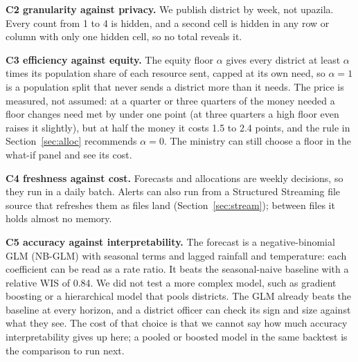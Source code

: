 \textbf{C2 granularity against privacy.} We publish district by week, not upazila. Every count from 1 to 4 is
hidden, and a second cell is hidden in any row or column with only one hidden cell, so no total reveals it.

\textbf{C3 efficiency against equity.} The equity floor $\alpha$ gives every district at least $\alpha$ times
its population share of each resource sent, capped at its own need, so $\alpha=1$ is a population split that never
sends a district more than it needs. The price is measured, not assumed: at a quarter or three quarters of the
money needed a floor changes need met by under one point (at three quarters a high floor even raises it slightly), but at half the money it costs 1.5 to 2.4 points, and the
rule in Section~\ref{sec:alloc} recommends $\alpha=0$. The ministry can still choose a floor in the what-if panel and see its cost.

\textbf{C4 freshness against cost.} Forecasts and allocations are weekly decisions, so they run in a daily
batch. Alerts can also run from a Structured Streaming file source that refreshes them as files land
(Section~\ref{sec:stream}); between files it holds almost no memory.

\textbf{C5 accuracy against interpretability.} The forecast is a negative-binomial GLM (NB-GLM) with seasonal terms and
lagged rainfall and temperature: each coefficient can be read as a rate ratio. It beats the seasonal-naive baseline with a
relative WIS of 0.84.
We did not test a more complex model, such as gradient boosting or a hierarchical model that pools districts.
The GLM already beats the baseline at every horizon, and a district officer can check its sign and size against
what they see. The cost of that choice is that we cannot say how much accuracy interpretability gives up here;
a pooled or boosted model in the same backtest is the comparison to run next.

